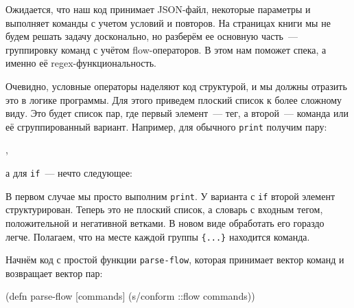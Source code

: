 \begin{english}
  \begin{clojure}
  \end{clojure}
\end{english}

Ожидается, что наш код принимает JSON-файл, некоторые параметры и выполняет
команды с учетом условий и повторов. На страницах книги мы не будем решать
задачу досконально, но разберём ее основную часть~--- группировку команд с
учётом flow-операторов. В этом нам поможет спека, а именно её
regex-функциональность.


Очевидно, условные операторы наделяют код структурой, и мы должны отразить это в
логике программы. Для этого приведем плоский список к более сложному виду. Это
будет список пар, где первый элемент~--- тег, а второй~--- команда или её
сгруппированный вариант. Например, для обычного \texttt{print} получим пару:

\begin{english}
  \begin{clojure}
,
  \end{clojure}
\end{english}

\noindent
а для \texttt{if}~--- нечто следующее:

\begin{english}
  \begin{clojure}
  \end{clojure}
\end{english}

В первом случае мы просто выполним \verb|print|. У варианта с \verb|if| второй
элемент структурирован. Теперь это не плоский список, а словарь с входным тегом,
положительной и негативной ветками. В новом виде обработать его гораздо
легче. Полагаем, что на месте каждой группы \verb|{...}| находится команда.

Начнём код с простой функции \texttt{parse-flow}, которая принимает вектор
команд и возвращает вектор пар:

\begin{english}
  \begin{clojure}
(defn parse-flow [commands]
  (s/conform ::flow commands))
  \end{clojure}
\end{english}

